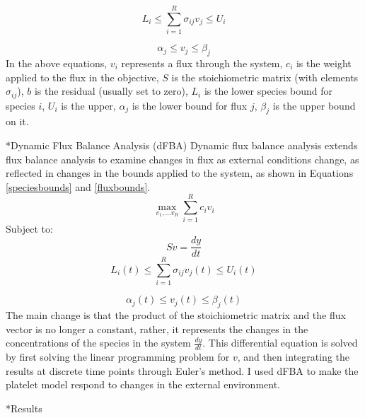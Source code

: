 \documentclass[11pt]{article}
\makeatletter
\renewcommand\subsection{\@startsection
	{subsection}{2}{0mm}
	{-0.05in}
	{-0.5\baselineskip}
	{\normalfont\normalsize\bfseries}}
\renewcommand\section{\@startsection
	{subsection}{2}{0mm}
	{-0.2in}
	{0.05\baselineskip}
	{\normalfont\large\bfseries}}
\makeatother
\begin{document}
\begin{equation}
L_i  \leq \sum_{i=1}^R \sigma_{ij}v_j \leq U_i
\end{equation}

\begin{equation}
\alpha_j \leq v_j \leq \beta_j
\end{equation}
In the above equations, $v_i$ represents a flux through the system, $c_i$ is the weight applied to the flux in the objective, $S$ is the stoichiometric matrix (with elements $\sigma_{ij}$), $b$ is the residual (usually set to zero), $L_i$ is the lower species bound for species $i$, $U_i$ is the upper, $\alpha_j$ is the lower bound for flux $j$, $\beta_j$ is the upper bound on it.
\subsection*{Dynamic Flux Balance Analysis (dFBA)}
Dynamic flux balance analysis extends flux balance analysis to examine changes in flux as external conditions change, as reflected in changes in the bounds applied to the system, as shown in Equations \ref{speciesbounds} and \ref{fluxbounds}.  
\begin{equation}
\max_{v_1,...v_R}\sum_{i=1}^Rc_iv_i
\end{equation}
Subject to:
\begin{equation}
Sv=\frac{dy}{dt}
\end{equation}
\begin{equation}
\label{speciesbounds}
L_i(t)  \leq \sum_{i=1}^R \sigma_{ij}v_j(t) \leq U_i(t)
\end{equation}

\begin{equation}
\label{fluxbounds}
\alpha_j(t) \leq v_j(t) \leq \beta_j(t)
\end{equation}
The main change is that the product of the stoichiometric matrix and the flux vector is no longer a constant, rather, it represents the changes in the concentrations of the species in the system $\frac{dy}{dt}$. This differential equation is solved by first solving the linear programming problem for $v$, and then integrating the results at discrete time points through Euler's method. I used dFBA to make the platelet model respond to changes in the external environment.
\section*{Results}
\end{document}
